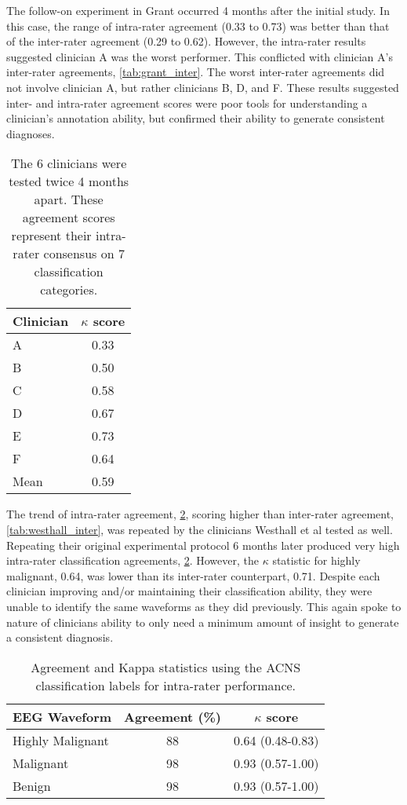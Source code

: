 The follow-on experiment in Grant occurred 4 months after the initial study. In this case, the range of intra-rater agreement (0.33 to 0.73) was better than that of the inter-rater agreement (0.29 to 0.62). However, the intra-rater results suggested clinician A was the worst performer. This conflicted with clinician A's inter-rater agreements, \cref{tab:grant_inter}. The worst inter-rater agreements did not involve clinician A, but rather clinicians B, D, and F. These results suggested inter- and intra-rater agreement scores were poor tools for understanding a clinician's annotation ability, but confirmed their ability to generate consistent diagnoses.

\begin{table}[ht]
\centering
\caption[Intra-rater agreement after 4 months]{The 6 clinicians were tested twice 4 months apart. These agreement scores represent their intra-rater consensus on 7 classification categories.}
\begin{tabular}{l c}
\toprule
Clinician	& $\kappa$ score \\
\midrule
A		& 0.33 \\
B		& 0.50 \\
C		& 0.58 \\
D		& 0.67 \\
E		& 0.73 \\
F		& 0.64 \\
Mean	& 0.59 \\
\bottomrule
\end{tabular}
\label{tab:grant_intra}
\end{table}

The trend of intra-rater agreement, \cref{tab:westhall_intra}, scoring higher than inter-rater agreement, \cref{tab:westhall_inter}, was repeated by the clinicians Westhall et al tested as well. Repeating their original experimental protocol 6 months later produced very high intra-rater classification agreements, \cref{tab:westhall_intra}. However, the $\kappa$ statistic for highly malignant, 0.64, was lower than its inter-rater counterpart, 0.71. Despite each clinician improving and/or maintaining their classification ability, they were unable to identify the same waveforms as they did previously. This again spoke to nature of clinicians ability to only need a minimum amount of insight to generate a consistent diagnosis.

\begin{table}[ht]
\caption[Intra-rater classification]{Agreement and Kappa statistics using the ACNS classification labels for intra-rater performance.}
\centering
\begin{tabular}{l c c}
\toprule
EEG Waveform & Agreement (\%) & $\kappa$ score \\
\midrule
Highly Malignant	& 88		& 0.64 (0.48-0.83) \\
Malignant			& 98		& 0.93 (0.57-1.00) \\
Benign			& 98		& 0.93 (0.57-1.00) \\
\bottomrule
\end{tabular}
\label{tab:westhall_intra}
\end{table}

